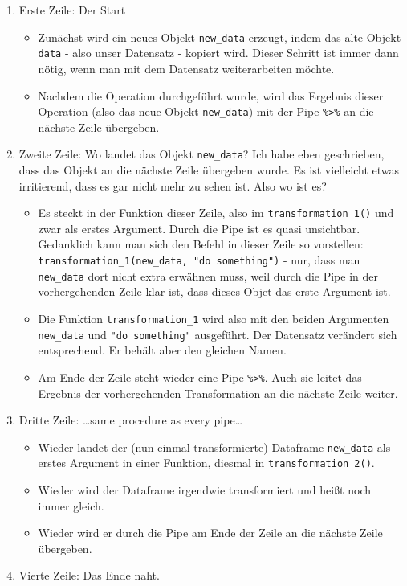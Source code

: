 \documentclass[
]{book}
\begin{document}
\begin{enumerate}
\def\labelenumi{\arabic{enumi}.}
\item
  Erste Zeile: Der Start

  \begin{itemize}
  \item
    Zunächst wird ein neues Objekt \texttt{new\_data} erzeugt, indem das alte Objekt \texttt{data} - also unser Datensatz - kopiert wird. Dieser Schritt ist immer dann nötig, wenn man mit dem Datensatz weiterarbeiten möchte.
  \item
    Nachdem die Operation durchgeführt wurde, wird das Ergebnis dieser Operation (also das neue Objekt \texttt{new\_data}) mit der Pipe \texttt{\%\textgreater{}\%} an die nächste Zeile übergeben.
  \end{itemize}
\item
  Zweite Zeile: Wo landet das Objekt \texttt{new\_data}? Ich habe eben geschrieben, dass das Objekt an die nächste Zeile übergeben wurde. Es ist vielleicht etwas irritierend, dass es gar nicht mehr zu sehen ist. Also wo ist es?

  \begin{itemize}
  \item
    Es steckt in der Funktion dieser Zeile, also im \texttt{transformation\_1()} und zwar als erstes Argument. Durch die Pipe ist es quasi unsichtbar. Gedanklich kann man sich den Befehl in dieser Zeile so vorstellen: \texttt{transformation\_1(new\_data,\ "do\ something")} - nur, dass man \texttt{new\_data} dort nicht extra erwähnen muss, weil durch die Pipe in der vorhergehenden Zeile klar ist, dass dieses Objet das erste Argument ist.
  \item
    Die Funktion \texttt{transformation\_1} wird also mit den beiden Argumenten \texttt{new\_data} und \texttt{"do\ something"} ausgeführt. Der Datensatz verändert sich entsprechend. Er behält aber den gleichen Namen.
  \item
    Am Ende der Zeile steht wieder eine Pipe \texttt{\%\textgreater{}\%}. Auch sie leitet das Ergebnis der vorhergehenden Transformation an die nächste Zeile weiter.
  \end{itemize}
\item
  Dritte Zeile: \ldots same procedure as every pipe\ldots{}

  \begin{itemize}
  \item
    Wieder landet der (nun einmal transformierte) Dataframe \texttt{new\_data} als erstes Argument in einer Funktion, diesmal in \texttt{transformation\_2()}.
  \item
    Wieder wird der Dataframe irgendwie transformiert und heißt noch immer gleich.
  \item
    Wieder wird er durch die Pipe am Ende der Zeile an die nächste Zeile übergeben.
  \end{itemize}
\item
  Vierte Zeile: Das Ende naht.


\end{enumerate}
\end{document}
